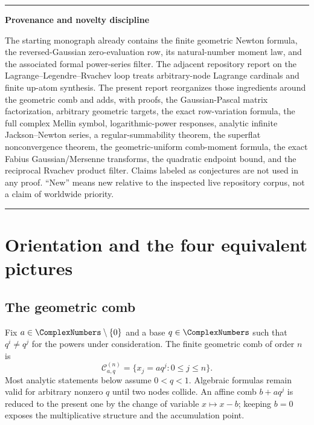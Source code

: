 \documentclass[11pt,a4paper,oneside]{article}
\theoremstyle{definition}
\theoremstyle{remark}
\newenvironment{statusbox}[1]{%
  \par\smallskip\noindent\begin{center}\begin{minipage}{0.94\textwidth}%
  \hrule\vspace{0.55em}\noindent\textbf{#1}\par\smallskip
}{%
  \vspace{0.55em}\hrule\end{minipage}\end{center}\smallskip
}
\begin{document}
\begin{abstract}
Finally, the Fourier product
\[
 \widehat u_q(\xi)=\prod_{j\ge0}
 \SincPi\!\left(2(1-q)q^j\xi\right)
\]
is fed back through the same geometric filter.  Away from its zeros this gives
a rapidly convergent reciprocal-product expansion for $1/\widehat u_q$, with
an explicit factorial--Gaussian error bound.  The report also relates the
multiplicative Gaussian filter to dyadic Thue--Morse spline formulas, to exact
finite synthesis by shifted up-functions, and to a collection of concrete
formalization and research problems.  An accompanying Python program verifies
the finite identities exactly, computes Fabius moments through order $80$, and
reproduces all numerical figures.
\end{abstract}

\begin{statusbox}{Provenance and novelty discipline}
The starting monograph already contains the finite geometric Newton formula,
the reversed-Gaussian zero-evaluation row, its natural-number moment law, and
the associated formal power-series filter.  The adjacent repository report on
the Lagrange--Legendre--Rvachev loop treats arbitrary-node Lagrange cardinals
and finite up-atom synthesis.  The present report reorganizes those ingredients
around the geometric comb and adds, with proofs, the Gaussian-Pascal matrix
factorization, arbitrary geometric targets, the exact row-variation formula,
the full complex Mellin symbol, logarithmic-power responses, analytic infinite
Jackson--Newton series, a regular-summability theorem, the superflat
nonconvergence theorem, the geometric-uniform comb-moment formula, the exact
Fabius Gaussian/Mersenne transforms, the quadratic endpoint bound, and the
reciprocal Rvachev product filter.  Claims labeled as conjectures are not used
in any proof.  ``New'' means new relative to the inspected live repository
corpus, not a claim of worldwide priority.
\end{statusbox}

\clearpage
\tableofcontents
\clearpage

\section{Orientation and the four equivalent pictures}
\label{sec:orientation}

\subsection{The geometric comb}

Fix $a\in\ComplexNumbers\setminus\{0\}$ and a base $q\in\ComplexNumbers$ such that
$q^i\ne q^j$ for the powers under consideration.  The finite geometric comb
of order $n$ is
\[
 \mathcal C_{a,q}^{(n)}=\{x_j=aq^j:0\le j\le n\}.
\]
Most analytic statements below assume $0<q<1$.  Algebraic formulas remain
valid for arbitrary nonzero $q$ until two nodes collide.  An affine comb
$b+aq^j$ is reduced to the present one by the change of variable $x\mapsto
x-b$; keeping $b=0$ exposes the multiplicative structure and the accumulation
point.
\end{document}
